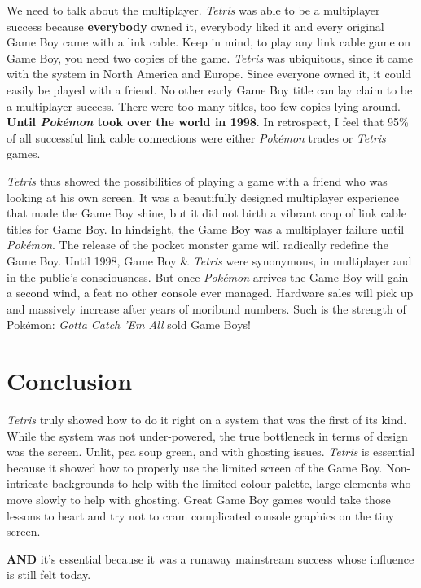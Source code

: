 \documentclass{book}
\begin{document}
We need to talk about the multiplayer. \emph{Tetris} was able to be a multiplayer success because \textbf{everybody} owned it, everybody liked it and every original Game Boy came with a link cable. Keep in mind, to play any link cable game on Game Boy, you need two copies of the game. \emph{Tetris} was ubiquitous, since it came with the system in North America and Europe. Since everyone owned it, it could easily be played with a friend. No other early Game Boy title can lay claim to be a multiplayer success. There were too many titles, too few copies lying around. \textbf{Until \emph{Pokémon} took over the world in 1998}. In retrospect, I feel that 95\% of all successful link cable connections were either \emph{Pokémon} trades or \emph{Tetris} games.\par
\emph{Tetris} thus showed the possibilities of playing a game with a friend who was looking at his own screen. It was a beautifully designed multiplayer experience that made the Game Boy shine, but it did not birth a vibrant crop of link cable titles for Game Boy. In hindsight, the Game Boy was a multiplayer failure until \emph{Pokémon}. The release of the pocket monster game will radically redefine the Game Boy. Until 1998, Game Boy \& \emph{Tetris} were synonymous, in multiplayer and in the public’s consciousness. But once \emph{Pokémon} arrives the Game Boy will gain a second wind, a feat no other console ever managed. Hardware sales will pick up and massively increase after years of moribund numbers. Such is the strength of Pokémon: \emph{Gotta Catch ’Em All} sold Game Boys!\par
\FloatBarrier\section*{Conclusion}
\emph{Tetris} truly showed how to do it right on a system that was the first of its kind. While the system was not under-powered, the true bottleneck in terms of design was the screen. Unlit, pea soup green, and with ghosting issues. \emph{Tetris} is essential because it showed how to properly use the limited screen of the Game Boy. Non-intricate backgrounds to help with the limited colour palette, large elements who move slowly to help with ghosting. Great Game Boy games would take those lessons to heart and try not to cram complicated console graphics on the tiny screen.\par
\textbf{AND} it’s essential because it was a runaway mainstream success whose influence is still felt today.\par
\FloatBarrier\vspace{\baselineskip}\begin{figure}[H]\end{figure}
\end{document}
